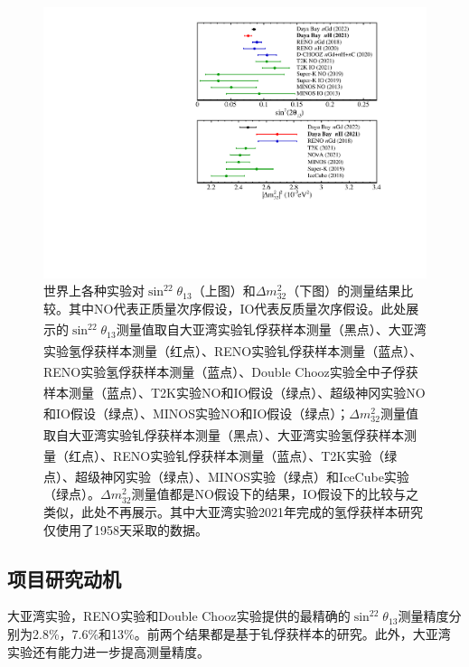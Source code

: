 \documentclass[a4paper,zihao=-4]{article}
\newcommand{\citess}[1]{\textsuperscript{\cite{#1}}}
\begin{document}
\begin{figure}[!htb]
    \centering
    \includegraphics[width=15cm]{WorldMeas.pdf}
    \caption{世界上各种实验对$\sin^22\theta_{13}$（上图）和$\Delta m_{32}^2$（下图）的测量结果比较。其中NO代表正质量次序假设，IO代表反质量次序假设。此处展示的$\sin^22\theta_{13}$测量值取自大亚湾实验钆俘获样本测量\citess{DayaBay:2022orm}（黑点）、大亚湾实验氢俘获样本测量（红点）、RENO实验钆俘获样本测量\citess{RENO:2018dro}（蓝点）、RENO实验氢俘获样本测量\citess{RENO:2019otc}（蓝点）、Double Chooz实验全中子俘获样本测量\citess{DoubleChooz:2019qbj}（蓝点）、T2K实验NO和IO假设\citess{T2K:2021xwb}（绿点）、超级神冈实验NO和IO假设\citess{Super-Kamiokande:2019gzr}（绿点）、MINOS实验NO和IO假设\citess{MINOS:2013xrl}（绿点）；$\Delta m_{32}^2$测量值取自大亚湾实验钆俘获样本测量\citess{DayaBay:2022orm}（黑点）、大亚湾实验氢俘获样本测量（红点）、RENO实验钆俘获样本测量\citess{RENO:2018dro}（蓝点）、T2K实验\citess{T2K:2021xwb}（绿点）、超级神冈实验\citess{Super-Kamiokande:2019gzr}（绿点）、MINOS实验\citess{MINOS:2020llm}（绿点）和IceCube实验\citess{IceCube:2017lak}（绿点）。$\Delta m_{32}^2$测量值都是NO假设下的结果，IO假设下的比较与之类似，此处不再展示。其中大亚湾实验2021年完成的氢俘获样本研究仅使用了1958天采取的数据。}
    \label{fig:world-status}
\end{figure}

\subsection{项目研究动机}
大亚湾实验，RENO实验和Double Chooz实验提供的最精确的$\sin^22\theta_{13}$测量精度分别为2.8\%，7.6\%和13\%。前两个结果都是基于钆俘获样本的研究。此外，大亚湾实验还有能力进一步提高测量精度。
\end{document}
